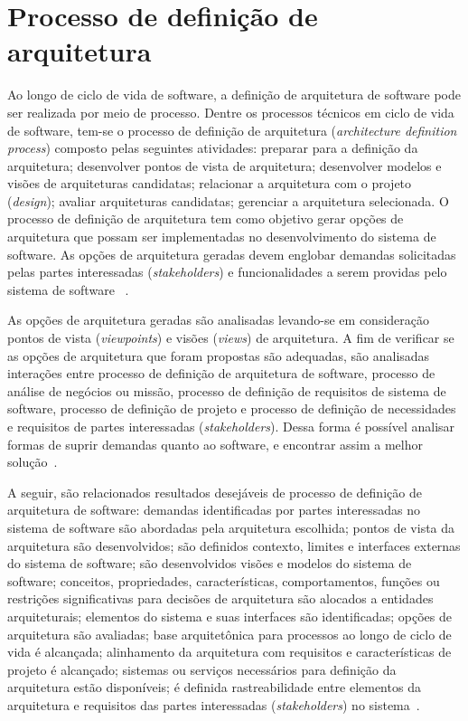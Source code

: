 \section{Processo de definição de arquitetura}

Ao longo de ciclo de vida de software, a definição de arquitetura de software pode ser realizada por meio de processo. Dentre os processos técnicos em ciclo de vida de software, tem-se o processo de definição de arquitetura (\emph{architecture definition process}) composto pelas seguintes atividades: preparar para a definição da arquitetura; desenvolver pontos de vista de arquitetura; desenvolver modelos e visões de arquiteturas candidatas; relacionar a arquitetura com o projeto (\emph{design}); avaliar arquiteturas candidatas; gerenciar a arquitetura selecionada. O processo de definição de arquitetura tem como objetivo gerar opções de arquitetura que possam ser implementadas no desenvolvimento do sistema de software. As opções de arquitetura geradas devem englobar demandas solicitadas pelas partes interessadas (\emph{stakeholders}) e funcionalidades a serem providas pelo sistema de software ~\cite{ISO_12207}.

As opções de arquitetura geradas são analisadas levando-se em consideração pontos de vista (\emph{viewpoints}) e visões (\emph{views}) de arquitetura. A fim de verificar se as opções de arquitetura que foram propostas são adequadas, são analisadas interações entre processo de definição de arquitetura de software, processo de análise de negócios ou missão, processo de definição de requisitos de sistema de software, processo de definição de projeto e processo de definição de necessidades e requisitos de partes interessadas (\emph{stakeholders}). Dessa forma é possível analisar formas de suprir demandas quanto ao software, e encontrar assim a melhor solução~\cite{ISO_12207}. 

A seguir, são relacionados resultados desejáveis de processo de definição de arquitetura de software: demandas identificadas por partes interessadas no sistema de software são abordadas pela arquitetura escolhida; pontos de vista da arquitetura são desenvolvidos; são definidos contexto, limites e interfaces externas do sistema de software; são desenvolvidos visões e modelos do sistema de software; 
conceitos, propriedades, características, comportamentos, 
funções ou restrições significativas para decisões de arquitetura são alocados a entidades arquiteturais; elementos do sistema e suas interfaces são identificadas; opções de arquitetura são avaliadas; base arquitetônica para processos ao longo de ciclo de vida é alcançada; 
alinhamento da arquitetura com requisitos e características de projeto é alcançado; sistemas ou serviços necessários para definição da arquitetura estão disponíveis; 
é definida rastreabilidade entre elementos da arquitetura e requisitos das partes interessadas (\emph{stakeholders}) no sistema~\cite{ISO_12207}.  

